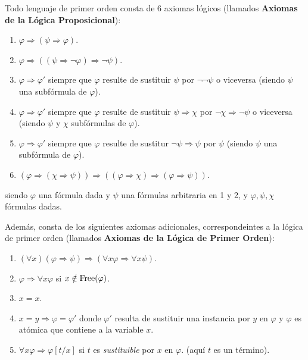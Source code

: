 \documentclass[12pt]{report}
\newcounter{it}
\theoremstyle{largebreak}
\newcommand{\free}{\textup{Free}}
\begin{document}
    \begin{mydef}
        Todo lenguaje de primer orden consta de 6 axiomas lógicos (llamados \textbf{Axiomas de la Lógica Proposicional}):
        \renewcommand{\theenumi}{\arabic{enumi}}
        \begin{enumerate}
            \item $\varphi\Rightarrow(\psi\Rightarrow\varphi)$.
            \item $\varphi\Rightarrow((\psi\Rightarrow\neg\varphi)\Rightarrow\neg\psi)$.
            \item $\varphi\Rightarrow\varphi'$ siempre que $\varphi$ resulte de sustituir $\psi$ por $\neg\neg\psi$ o viceversa (siendo $\psi$ una subfórmula de $\varphi$).
            \item $\varphi\Rightarrow\varphi'$ siempre que $\varphi$ resulte de sustituir $\psi\Rightarrow\chi$ por $\neg\chi\Rightarrow\neg\psi$ o viceversa (siendo $\psi$ y $\chi$ subfórmulas de $\varphi$).
            \item $\varphi\Rightarrow\varphi'$ siempre que $\varphi$ resulte de sustitur $\neg\psi\Rightarrow\psi$ por $\psi$ (siendo $\psi$ una subfórmula de $\varphi$).
            \item $(\varphi\Rightarrow(\chi\Rightarrow\psi))\Rightarrow((\varphi\Rightarrow\chi)\Rightarrow(\varphi\Rightarrow\psi))$.
        \end{enumerate}
        siendo $\varphi$ una fórmula dada y $\psi$ una fórmulas arbitraria en 1 y 2, y $\varphi,\psi,\chi$ fórmulas dadas.

        Además, consta de los siguientes axiomas adicionales, correspondeintes a la lógica de primer orden (llamados \textbf{Axiomas de la Lógica de Primer Orden}):
        \begin{enumerate}
            \item $(\forall x)(\varphi\Rightarrow\psi)\Rightarrow(\forall x\varphi\Rightarrow\forall x\psi)$.
            \item $\varphi\Rightarrow\forall x\varphi$ si $x\notin\free(\varphi)$.
            \item $x=x$.
            \item $x=y\Rightarrow \varphi=\varphi'$ donde $\varphi'$ resulta de sustituir una instancia por $y$ en $\varphi$ y $\varphi$ es atómica que contiene a la variable $x$.
            \item $\forall x\varphi\Rightarrow\varphi[t/x]$ si $t$ es \textit{sustituible} por $x$ en $\varphi$. (aquí $t$ es un término).
        \end{enumerate}
    \end{mydef}
\end{document}
